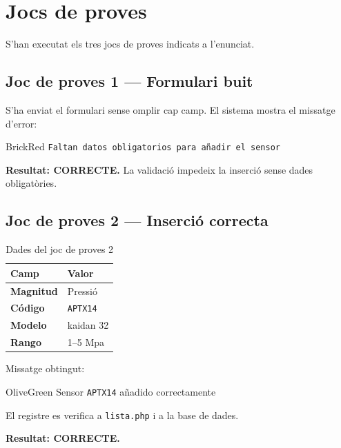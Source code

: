 \documentclass[12pt, a4paper]{article}
\begin{document}
\section{Jocs de proves}

S'han executat els tres jocs de proves indicats a l'enunciat.

\subsection{Joc de proves 1 --- Formulari buit}

S'ha enviat el formulari sense omplir cap camp. El sistema mostra el missatge d'error:

\begin{resultbox}[Resultat]{BrickRed}
  \texttt{Faltan datos obligatorios para añadir el sensor}
\end{resultbox}

\textbf{Resultat: CORRECTE.} La validació impedeix la inserció sense dades obligatòries.

\subsection{Joc de proves 2 --- Inserció correcta}

\begin{table}[h!]
  \centering
  \caption{Dades del joc de proves 2}
  \label{tab:jp2}
  \begin{tabularx}{0.65\textwidth}{>{\bfseries}l X}
    \toprule
    Camp     & Valor \\
    \midrule
    Magnitud & Pressió \\
    Código   & \texttt{APTX14} \\
    Modelo   & kaidan 32 \\
    Rango    & 1--5 Mpa \\
    \bottomrule
  \end{tabularx}
\end{table}

Missatge obtingut:

\begin{resultbox}[Resultat]{OliveGreen}
  Sensor \texttt{APTX14} añadido correctamente
\end{resultbox}

El registre es verifica a \texttt{lista.php} i a la base de dades.

\textbf{Resultat: CORRECTE.}
\end{document}
